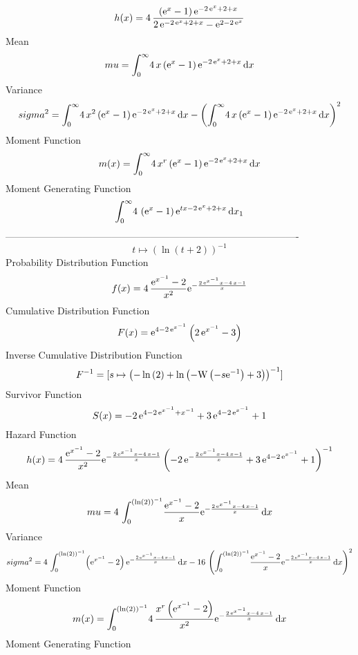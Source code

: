 \documentclass[12pt]{article}
\begin{document}
 $$ h(x)=4\,{\frac { \left( {{\rm e}^{x}}-1 \right) {{\rm e}^{-2\,{{\rm e}^{x}}
+2+x}}}{2\,{{\rm e}^{-2\,{{\rm e}^{x}}+2+x}}-{{\rm e}^{2-2\,{{\rm e}^{
x}}}}}}
$$Mean 
 $$ mu=\int_{0}^{\infty }\!4\,x \left( {{\rm e}^{x}}-1 \right) {{\rm e}^{-2\,
{{\rm e}^{x}}+2+x}}\,{\rm d}x
$$ Variance 
 $$ sigma^2 = \int_{0}^{\infty }\!4\,{x}^{2} \left( {{\rm e}^{x}}-1 \right) {{\rm e}
^{-2\,{{\rm e}^{x}}+2+x}}\,{\rm d}x- \left( \int_{0}^{\infty }\!4\,x
 \left( {{\rm e}^{x}}-1 \right) {{\rm e}^{-2\,{{\rm e}^{x}}+2+x}}
\,{\rm d}x \right) ^{2}
$$Moment Function 
 $$ m(x) = \int_{0}^{\infty }\!4\,{x}^{r} \left( {{\rm e}^{x}}-1 \right) {{\rm e}
^{-2\,{{\rm e}^{x}}+2+x}}\,{\rm d}x
$$ Moment Generating Function 
 $$\int_{0}^{\infty }\!4\, \left( {{\rm e}^{x}}-1 \right) {{\rm e}^{tx-2
\,{{\rm e}^{x}}+2+x}}\,{\rm d}x_{{1}}
$$-------------------------------------------------------------------------------------------  \\$$t\mapsto  \left( \ln  \left( t+2 \right)  \right) ^{-1}
$$Probability Distribution Function 
$$  f(x)=4\,{\frac {{{\rm e}^{{x}^{-1}}}-2}{{x}^{2}}{{\rm e}^{-{\frac {2\,{
{\rm e}^{{x}^{-1}}}x-4\,x-1}{x}}}}}
$$Cumulative Distribution Function  
 $$F(x)={{\rm e}^{4-2\,{{\rm e}^{{x}^{-1}}}}} \left( 2\,{{\rm e}^{{x}^{-1}}}-3
 \right) 
$$ Inverse Cumulative Distribution Function 
  $$F^{-1} = [s\mapsto  \left( -\ln  \left( 2 \right) +\ln  \left( -{\rm W} \left(-
s{{\rm e}^{-1}}\right)+3 \right)  \right) ^{-1}]
$$Survivor Function 
 $$ S(x)=-2\,{{\rm e}^{4-2\,{{\rm e}^{{x}^{-1}}}+{x}^{-1}}}+3\,{{\rm e}^{4-2\,{
{\rm e}^{{x}^{-1}}}}}+1
$$ Hazard Function 
 $$ h(x)=4\,{\frac {{{\rm e}^{{x}^{-1}}}-2}{{x}^{2}}{{\rm e}^{-{\frac {2\,{
{\rm e}^{{x}^{-1}}}x-4\,x-1}{x}}}} \left( -2\,{{\rm e}^{-{\frac {2\,{
{\rm e}^{{x}^{-1}}}x-4\,x-1}{x}}}}+3\,{{\rm e}^{4-2\,{{\rm e}^{{x}^{-1
}}}}}+1 \right) ^{-1}}
$$Mean 
 $$ mu=4\,\int_{0}^{ \left( \ln  \left( 2 \right)  \right) ^{-1}}\!{\frac {{
{\rm e}^{{x}^{-1}}}-2}{x}{{\rm e}^{-{\frac {2\,{{\rm e}^{{x}^{-1}}}x-4
\,x-1}{x}}}}}\,{\rm d}x
$$ Variance 
 $$ sigma^2 = 4\,\int_{0}^{ \left( \ln  \left( 2 \right)  \right) ^{-1}}\! \left( {
{\rm e}^{{x}^{-1}}}-2 \right) {{\rm e}^{-{\frac {2\,{{\rm e}^{{x}^{-1}
}}x-4\,x-1}{x}}}}\,{\rm d}x-16\, \left( \int_{0}^{ \left( \ln  \left( 
2 \right)  \right) ^{-1}}\!{\frac {{{\rm e}^{{x}^{-1}}}-2}{x}{{\rm e}^
{-{\frac {2\,{{\rm e}^{{x}^{-1}}}x-4\,x-1}{x}}}}}\,{\rm d}x \right) ^{
2}
$$Moment Function 
 $$ m(x) = \int_{0}^{ \left( \ln  \left( 2 \right)  \right) ^{-1}}\!4\,{\frac {{x
}^{r} \left( {{\rm e}^{{x}^{-1}}}-2 \right) }{{x}^{2}}{{\rm e}^{-{
\frac {2\,{{\rm e}^{{x}^{-1}}}x-4\,x-1}{x}}}}}\,{\rm d}x
$$ Moment Generating Function 
\end{document}
